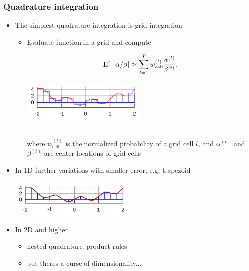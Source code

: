 \documentclass[10pt]{beamer}
\begin{document}
\begin{frame}

\frametitle{Quadrature integration}

  \begin{itemize}
  \item The simplest quadrature integration is grid integration
    \begin{itemize}
    \item Evaluate function in a grid and compute\\
    \hspace{-1cm}\begin{minipage}{4cm}
    \begin{align*}
      \mathrm{E}[-\alpha/\beta] \approx \sum_{t=1}^{T} w_{\mathrm{cell}}^{(t)} \frac{\alpha^{(t)}}{\beta^{(t)}},
    \end{align*}
  \end{minipage}
  \begin{minipage}{6cm}
  \includegraphics[width=6cm]{figs/Integration_rectangle.png}
\end{minipage}\\
where $w_{\mathrm{cell}}^{(t)}$ is the normalized probability of a grid cell $t$, and $\alpha^{(t)}$ and $\beta^{(t)}$ are center locations of grid cells
\end{itemize}
\item<2-> In 1D further variations with smaller error, e.g. trapezoid
  \begin{center}
    \includegraphics[width=6cm]{figs/Integration_trapezoid.png}
  \end{center}
\item<3-> In 2D and higher
  \begin{itemize}
  \item nested quadrature, product rules
  \item but theres a curse of dimensionality...
  \end{itemize}
  \end{itemize}


\end{frame}
\end{document}
